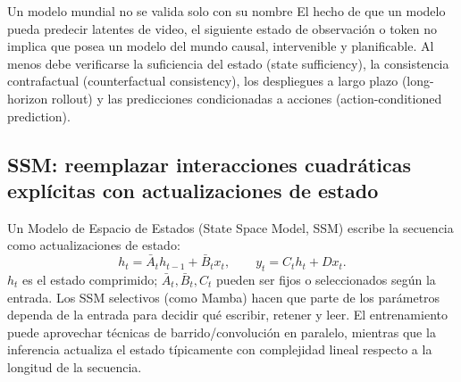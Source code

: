 


\begin{warningbox}{Un modelo mundial no se valida solo con su nombre}
El hecho de que un modelo pueda predecir latentes de video, el siguiente estado de observación o token no implica que posea un modelo del mundo causal, intervenible y planificable. Al menos debe verificarse la suficiencia del estado (state sufficiency), la consistencia contrafactual (counterfactual consistency), los despliegues a largo plazo (long-horizon rollout) y las predicciones condicionadas a acciones (action-conditioned prediction).
\end{warningbox}

\subsection{SSM: reemplazar interacciones cuadráticas explícitas con actualizaciones de estado}

Un Modelo de Espacio de Estados (State Space Model, SSM) escribe la secuencia como actualizaciones de estado:
\[
h_t=\bar{A}_t h_{t-1}+\bar{B}_t x_t,
\qquad y_t=C_t h_t+D x_t.
\]
$h_t$ es el estado comprimido; $\bar{A}_t,\bar{B}_t,C_t$ pueden ser fijos o seleccionados según la entrada. Los SSM selectivos (como Mamba) hacen que parte de los parámetros dependa de la entrada para decidir qué escribir, retener y leer. El entrenamiento puede aprovechar técnicas de barrido/convolución en paralelo, mientras que la inferencia actualiza el estado típicamente con complejidad lineal respecto a la longitud de la secuencia.



